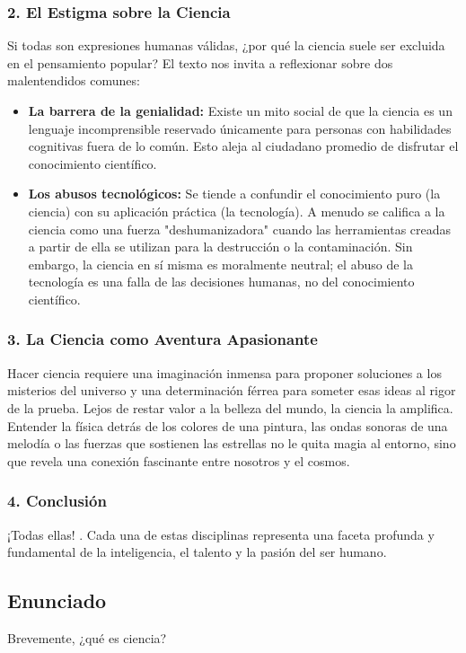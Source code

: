 \documentclass[12pt, a4paper]{article}
\begin{document}
\subsubsection*{2. El Estigma sobre la Ciencia}
Si todas son expresiones humanas válidas, ¿por qué la ciencia suele ser excluida en el pensamiento popular? El texto nos invita a reflexionar sobre dos malentendidos comunes:
\begin{itemize}
    \item \textbf{La barrera de la genialidad:} Existe un mito social de que la ciencia es un lenguaje incomprensible reservado únicamente para personas con habilidades cognitivas fuera de lo común. Esto aleja al ciudadano promedio de disfrutar el conocimiento científico.
    \item \textbf{Los abusos tecnológicos:} Se tiende a confundir el conocimiento puro (la ciencia) con su aplicación práctica (la tecnología). A menudo se califica a la ciencia como una fuerza "deshumanizadora" cuando las herramientas creadas a partir de ella se utilizan para la destrucción o la contaminación. Sin embargo, la ciencia en sí misma es moralmente neutral; el abuso de la tecnología es una falla de las decisiones humanas, no del conocimiento científico.
\end{itemize}

\subsubsection*{3. La Ciencia como Aventura Apasionante}
Hacer ciencia requiere una imaginación inmensa para proponer soluciones a los misterios del universo y una determinación férrea para someter esas ideas al rigor de la prueba. Lejos de restar valor a la belleza del mundo, la ciencia la amplifica. Entender la física detrás de los colores de una pintura, las ondas sonoras de una melodía o las fuerzas que sostienen las estrellas no le quita magia al entorno, sino que revela una conexión fascinante entre nosotros y el cosmos.

\subsubsection*{4. Conclusión}
¡Todas ellas! . Cada una de estas disciplinas representa una faceta profunda y fundamental de la inteligencia, el talento y la pasión del ser humano.

\newpage

\subsection*{Enunciado}
Brevemente, ¿qué es ciencia?
\end{document}
